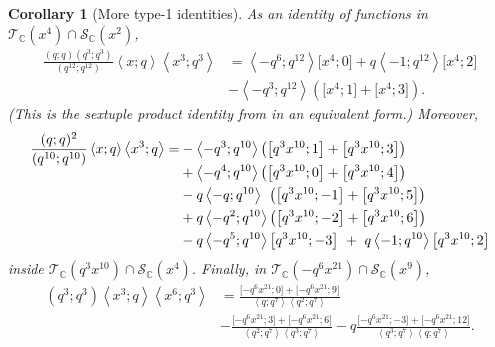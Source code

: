 \documentclass[reqno,11pt]{amsart}
\newtheorem{corollary}[theorem]{Corollary}
\theoremstyle{definition}
\theoremstyle{remark}
\numberwithin{equation}{section}
\newcommand{\C}{\mathbb{C}}
\newcommand{\mT}{\mathcal{T}}
\newcommand{\mS}{\mathcal{S}}
\newcommand{\la}{\left\langle}
\newcommand{\ra}{\right\rangle}
\newcommand{\vect}[2]{\big[{#1};{#2}\big]}
\begin{document}
\begin{corollary}[More type-1 identities]
As an identity of functions in $\mT_\C\left(x^4\right) \cap \mS_\C\left(x^2\right)$,
\begin{equation}\label{eq:sextuple}
\begin{aligned}
    \frac{(q; q)\left(q^3; q^3\right)}{\left(q^{12}; q^{12}\right)} 
    \la x; q\ra \la x^3; q^3\ra 
    &=
    \la-q^6; q^{12} \ra \vect{x^4}{0}
    +
    q \la-1; q^{12} \ra \vect{x^4}{2}
    \\[-5pt]
    &-
    \la-q^3; q^{12} \ra\left(\vect{x^4}{1} + \vect{x^4}{3} \right).
\end{aligned}
\end{equation}
(This is the sextuple product identity from \cite{zhu2011sextuple} in an equivalent form.) Moreover,
\begin{equation}\label{eq:order-10}
\begin{aligned}
    \frac{(q; q)^2}{\left(q^{10}; q^{10}\right)} \la x; q\ra \la x^3; q \ra 
    =
    &- \la -q^3; q^{10}\ra
    \left(\vect{q^3x^{10}}{1} + \vect{q^3x^{10}}{3}\right) \\[-5pt]
    &+ \la -q^4; q^{10}\ra
    \left(\vect{q^3x^{10}}{0} + \vect{q^3x^{10}}{4}\right)\\
    &- q\la-q; q^{10}\ra \hspace{0.15cm}
    \left(\vect{q^3x^{10}}{-1} + \vect{q^3x^{10}}{5}\right)
    \\
    &+ q\la-q^2; q^{10}\ra
    \left(\vect{q^3x^{10}}{-2} + \vect{q^3x^{10}}{6}\right)\\
    &- q\la-q^5; q^{10}\ra
    \vect{q^3x^{10}}{-3} 
    \ +\  q\la-1; q^{10}\ra\vect{q^3x^{10}}{2}
\end{aligned}
\end{equation}
inside $\mT_\C\left(q^3 x^{10}\right) \cap \mS_\C\left(x^4\right)$. Finally, in $\mT_\C\left(-q^6 x^{21}\right) \cap \mS_\C\left(x^9\right)$,
\begin{equation}\label{eq:order-21}
\begin{aligned}
    \left(q^3; q^3\right)\la x^3; q \ra \la x^6; q^3\ra
    &=
    \frac{\vect{-q^6 x^{21}}{0} + \vect{-q^6x^{21}}{9}}
    {\la q; q^7\ra \la q^2; q^7 \ra}
    \\
    &-
    \frac{\vect{-q^6 x^{21}}{3} + \vect{-q^6x^{21}}{6}}
    {\la q^2; q^7\ra \la q^3; q^7 \ra}
    -
    q
    \frac{\vect{-q^6 x^{21}}{-3} + \vect{-q^6x^{21}}{12}}
    {\la q^3; q^7\ra \la q; q^7 \ra}.
\end{aligned}
\end{equation}
\end{corollary}
\end{document}
